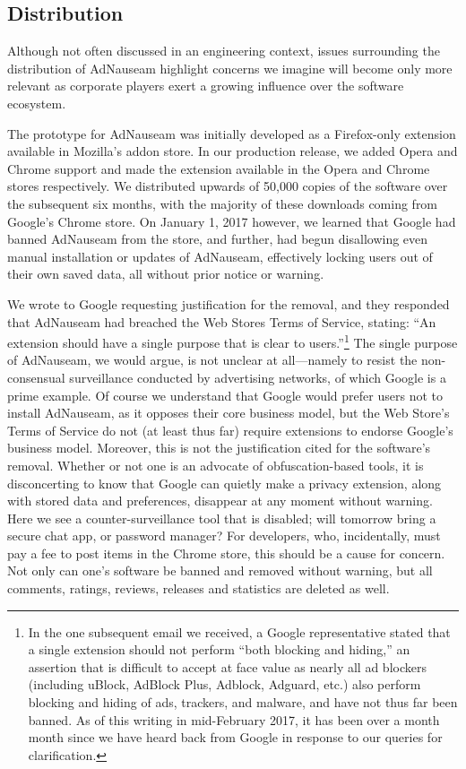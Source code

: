 \documentclass[conference]{IEEEtran}
\begin{document}
\subsection{Distribution}

Although not often discussed in an engineering context, issues surrounding the distribution of AdNauseam highlight concerns we imagine will become only more relevant as corporate players exert a growing influence over the software ecosystem.

The prototype for AdNauseam was initially developed as a Firefox-only extension available in  Mozilla's addon store. In our production release, we added Opera and Chrome support and made the extension available in the Opera and Chrome stores respectively. We distributed upwards of 50,000 copies of the software over the subsequent six months, with the majority of these downloads coming from Google's Chrome store. On January 1, 2017 however, we learned that Google had banned AdNauseam from the store, and further, had begun disallowing even manual installation or updates of AdNauseam, effectively locking users out of their own saved data, all without prior notice or warning.

We wrote to Google requesting justification for the removal, and they responded that AdNauseam had breached the Web Stores Terms of Service, stating: “An extension should have a single purpose that is clear to users.”\footnote{In the one subsequent email we received, a Google representative stated that a single extension should not perform “both blocking and hiding,” an assertion that is difficult to accept at face value as nearly all ad blockers (including uBlock, AdBlock Plus, Adblock, Adguard, etc.) also perform blocking and hiding of ads, trackers, and malware, and have not thus far been banned. As of this writing in mid-February 2017, it has been over a month month since we have heard back from Google in response to our queries for clarification.} The single purpose of AdNauseam, we would argue, is not unclear at all---namely to resist the non-consensual surveillance conducted by advertising networks, of which Google is a prime example. Of course we understand that Google would prefer users not to install AdNauseam, as it opposes their core business model, but the Web Store's Terms of Service do not (at least thus far) require extensions to endorse Google's business model. Moreover, this is not the justification cited for the software's removal. Whether or not one is an advocate of obfuscation-based tools, it is disconcerting to know that Google can quietly make a privacy extension, along with stored data and preferences, disappear at any moment without warning. Here we see a counter-surveillance tool that is disabled; will tomorrow bring a secure chat app, or password manager? For developers, who, incidentally, must pay a fee to post items in the Chrome store, this should be a cause for concern. Not only can one's software be banned and removed without warning, but all comments, ratings, reviews, releases and statistics are deleted as well.
\end{document}
